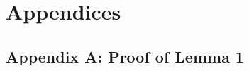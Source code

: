 \documentclass[11pt]{article}
\begin{document}


 









\section*{Appendices  }

\subsection*{Appendix A: Proof of Lemma 1  }
\end{document}

